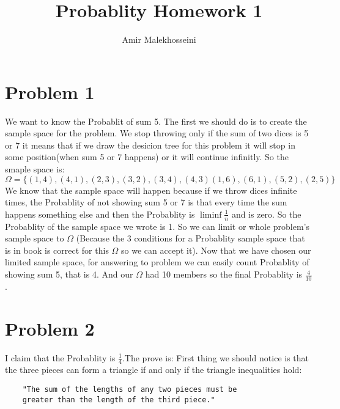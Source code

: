 \documentclass[12pt]{article}
\title{Probablity Homework 1}
\author{Amir Malekhosseini}
\affil{Student id: 401100528}
\affil{Department of Mathematical Science, Sharif University Of Technology}
\begin{document}
\maketitle

\section*{Problem 1}
We want to know the Probablit of sum 5.
\newline The first we should do is to create the sample space for the problem.
\newline We stop throwing only if the sum of two dices is 5 or 7
it means that if we draw the desicion tree for this problem
it will stop in some position(when sum 5 or 7 happens) or it will continue infinitly.
\newline So the smaple space is:
\newline $\Omega = \{(1,4),(4,1),(2,3),(3,2),(3,4),(4,3)(1,6),(6,1),(5,2),(2,5)\} $
\newline We know that the sample space will happen because if we throw dices infinite times,
the Probablity of not showing sum 5 or 7 is that every time the sum happens something else and then
the Probablity is $ \liminf\frac{1}{n} $ and is zero.
\newline So the Probablity of the sample space we wrote is 1. So we can limit or whole problem's sample space to $\Omega$
(Because the 3 conditions for a Probablity sample space that is in book is correct for this $\Omega$ so we can accept it).
\newline Now that we have chosen our limited sample space, for answering to problem we can easily count Probablity of showing sum 5, that is 4.
\newline And our $\Omega$ had 10 members so the final Probablity is $\frac{4}{10}$.

\section*{Problem 2}
I claim that the Probablity is $\frac{1}{4}$.The prove is:
\newline First thing we should notice is that the three pieces can form a triangle if and only if the triangle inequalities hold:
\newline
\begin{verbatim}
    "The sum of the lengths of any two pieces must be
    greater than the length of the third piece."
\end{verbatim}
\end{document}
